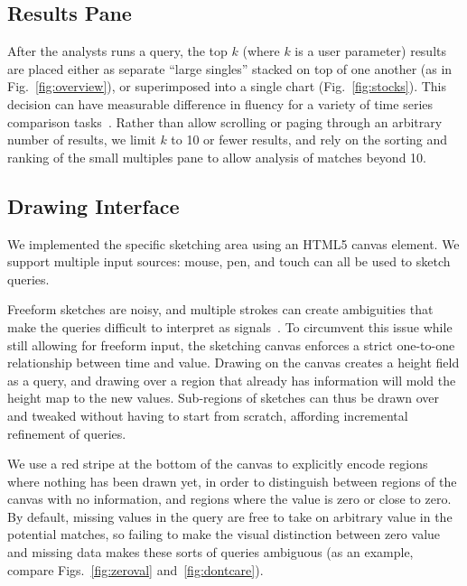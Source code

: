 \subsection{Results Pane}
\label{sec:results}

\stocksFig

After the analysts runs a query, the top $k$ (where $k$ is a user parameter) results are placed either as separate ``large singles'' stacked on top of one another (as in Fig.~\ref{fig:overview}), or superimposed into a single chart (Fig.~\ref{fig:stocks}). This decision can have measurable difference in fluency for a variety of time series comparison tasks~\cite{javed2010graphical}. Rather than allow scrolling or paging through an arbitrary number of results, we limit $k$ to 10 or fewer results, and rely on the sorting and ranking of the small multiples pane to allow analysis of matches beyond 10.

\subsection{Drawing Interface}
\label{sec:drawing}
We implemented the specific sketching area using an HTML5 canvas element. We support multiple input sources: mouse, pen, and touch can all be used to sketch queries.

Freeform sketches are noisy, and multiple strokes can create ambiguities that make the queries difficult to interpret as signals~\cite{eichmann2015evaluating}. To circumvent this issue while still allowing for freeform input, the sketching canvas enforces a strict one-to-one relationship between time and value. Drawing on the canvas creates a height field as a query, and drawing over a region that already has information will mold the height map to the new values. Sub-regions of sketches can thus be drawn over and tweaked without having to start from scratch, affording incremental refinement of queries.

We use a red stripe at the bottom of the canvas to explicitly encode regions where nothing has been drawn yet, in order to distinguish between regions of the canvas with no information, and regions where the value is zero or close to zero. By default, missing values in the query are free to take on arbitrary value in the potential matches, so failing to make the visual distinction between zero value and missing data makes these sorts of queries ambiguous (as an example, compare Figs.~\ref{fig:zeroval} and~\ref{fig:dontcare}).

